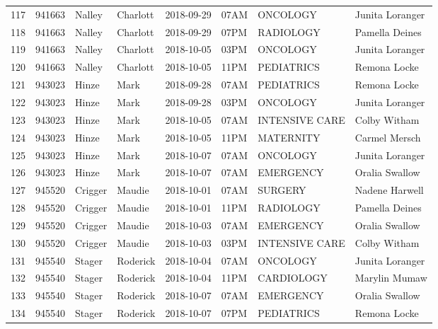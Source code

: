 \documentclass[11pt]{article}
\begin{document}
\begin{tabular}{|l|l|l|l|l|l|l|l|}
	117 &  941663 &    Nalley &  Charlott &      2018-09-29 &  07AM &        ONCOLOGY &  Junita Loranger \\
	118 &  941663 &    Nalley &  Charlott &      2018-09-29 &  07PM &       RADIOLOGY &   Pamella Deines \\
	119 &  941663 &    Nalley &  Charlott &      2018-10-05 &  03PM &        ONCOLOGY &  Junita Loranger \\
	120 &  941663 &    Nalley &  Charlott &      2018-10-05 &  11PM &      PEDIATRICS &     Remona Locke \\
	121 &  943023 &     Hinze &      Mark &      2018-09-28 &  07AM &      PEDIATRICS &     Remona Locke \\
	122 &  943023 &     Hinze &      Mark &      2018-09-28 &  03PM &        ONCOLOGY &  Junita Loranger \\
	123 &  943023 &     Hinze &      Mark &      2018-10-05 &  07AM &  INTENSIVE CARE &     Colby Witham \\
	124 &  943023 &     Hinze &      Mark &      2018-10-05 &  11PM &       MATERNITY &    Carmel Mersch \\
	125 &  943023 &     Hinze &      Mark &      2018-10-07 &  07AM &        ONCOLOGY &  Junita Loranger \\
	126 &  943023 &     Hinze &      Mark &      2018-10-07 &  07AM &       EMERGENCY &   Oralia Swallow \\
	127 &  945520 &   Crigger &    Maudie &      2018-10-01 &  07AM &         SURGERY &   Nadene Harwell \\
	128 &  945520 &   Crigger &    Maudie &      2018-10-01 &  11PM &       RADIOLOGY &   Pamella Deines \\
	129 &  945520 &   Crigger &    Maudie &      2018-10-03 &  07AM &       EMERGENCY &   Oralia Swallow \\
	130 &  945520 &   Crigger &    Maudie &      2018-10-03 &  03PM &  INTENSIVE CARE &     Colby Witham \\
	131 &  945540 &    Stager &  Roderick &      2018-10-04 &  07AM &        ONCOLOGY &  Junita Loranger \\
	132 &  945540 &    Stager &  Roderick &      2018-10-04 &  11PM &      CARDIOLOGY &    Marylin Mumaw \\
	133 &  945540 &    Stager &  Roderick &      2018-10-07 &  07AM &       EMERGENCY &   Oralia Swallow \\
	134 &  945540 &    Stager &  Roderick &      2018-10-07 &  07PM &      PEDIATRICS &     Remona Locke \\

\end{tabular}
\end{document}
